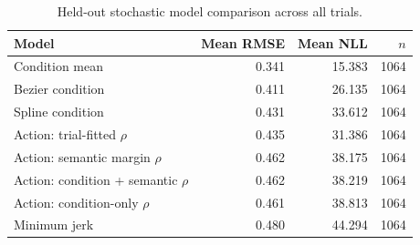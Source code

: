 \begin{table}[htbp]
\centering
\caption{Held-out stochastic model comparison across all trials.}
\label{tab:stochastic}
\begin{tabular}{l r r r}
\toprule
Model & Mean RMSE & Mean NLL & $n$ \\
\midrule
Condition mean & 0.341 & 15.383 & 1064 \\
Bezier condition & 0.411 & 26.135 & 1064 \\
Spline condition & 0.431 & 33.612 & 1064 \\
Action: trial-fitted $\rho$ & 0.435 & 31.386 & 1064 \\
Action: semantic margin $\rho$ & 0.462 & 38.175 & 1064 \\
Action: condition + semantic $\rho$ & 0.462 & 38.219 & 1064 \\
Action: condition-only $\rho$ & 0.461 & 38.813 & 1064 \\
Minimum jerk & 0.480 & 44.294 & 1064 \\
\bottomrule
\end{tabular}
\end{table}

